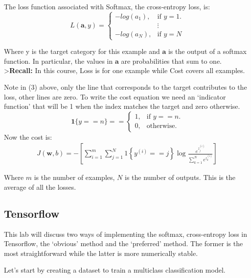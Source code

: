 \documentclass[11pt]{article}
\begin{document}
    The loss function associated with Softmax, the cross-entropy loss, is:
\begin{equation}
  L(\mathbf{a},y)=\begin{cases}
    -log(a_1), & \text{if $y=1$}.\\
        &\vdots\\
     -log(a_N), & \text{if $y=N$}
  \end{cases} \tag{3}
\end{equation}

Where y is the target category for this example and \(\mathbf{a}\) is
the output of a softmax function. In particular, the values in
\(\mathbf{a}\) are probabilities that sum to one.
\textgreater{}\textbf{Recall:} In this course, Loss is for one example
while Cost covers all examples.

Note in (3) above, only the line that corresponds to the target
contributes to the loss, other lines are zero. To write the cost
equation we need an `indicator function' that will be 1 when the index
matches the target and zero otherwise.
\[\mathbf{1}\{y == n\} = =\begin{cases}
    1, & \text{if $y==n$}.\\
    0, & \text{otherwise}.
  \end{cases}\] Now the cost is: \begin{align}
J(\mathbf{w},b) = - \left[ \sum_{i=1}^{m} \sum_{j=1}^{N}  1\left\{y^{(i)} == j\right\} \log \frac{e^{z^{(i)}_j}}{\sum_{k=1}^N e^{z^{(i)}_k} }\right] \tag{4}
\end{align}

Where \(m\) is the number of examples, \(N\) is the number of outputs.
This is the average of all the losses.

    \hypertarget{tensorflow}{%
\subsection{Tensorflow}\label{tensorflow}}

This lab will discuss two ways of implementing the softmax,
cross-entropy loss in Tensorflow, the `obvious' method and the
`preferred' method. The former is the most straightforward while the
latter is more numerically stable.

Let's start by creating a dataset to train a multiclass classification
model.
\end{document}
